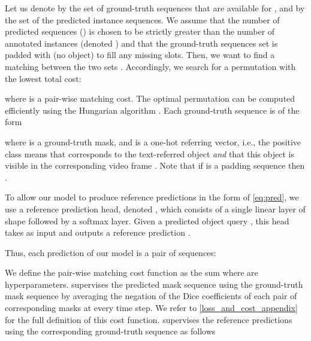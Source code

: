 \documentclass[10pt,twocolumn,letterpaper]{article}
\renewcommand{\cite}[1]{\citep{#1}}
\begin{document}
Let us denote by  the set of ground-truth sequences that are available for , and by  the set of the predicted instance sequences. We assume that the number of predicted sequences () is chosen to be strictly greater than the number of annotated instances (denoted ) and that the ground-truth sequences set is padded with  (no object) to fill any missing slots. Then, we want to find a matching between the two sets \cite{carion2020detr,wang2021vistr}. Accordingly, we search for a permutation  with the lowest total cost:

where  is a pair-wise matching cost.
The optimal permutation  can be  computed efficiently using the Hungarian algorithm \cite{kuhn1955hungarian}. 
Each ground-truth sequence is of the form

where  is a ground-truth mask, and  is a one-hot referring vector, i.e., the positive class means that  corresponds to the text-referred object \textit{and} that this object is visible in the corresponding video frame . Note that if  is a padding sequence then .

To allow our model to produce reference predictions in the form of \cref{eq:pred}, we use a reference prediction head, denoted , which consists of a single linear layer of shape  followed by a softmax layer. Given a predicted object query , this head takes  as input and outputs a reference prediction .

Thus, each prediction of our model is a pair of sequences:

We define the pair-wise matching cost function as the sum 
where  are hyperparameters.
 supervises the predicted mask sequence using the ground-truth mask sequence by averaging the negation of the Dice coefficients \cite{milletari2016vnet} of each pair of corresponding masks at every time step. We refer to \cref{loss_and_cost_appendix} for the full definition of this cost function.
 supervises the reference predictions using the corresponding ground-truth sequence as follows
\end{document}
